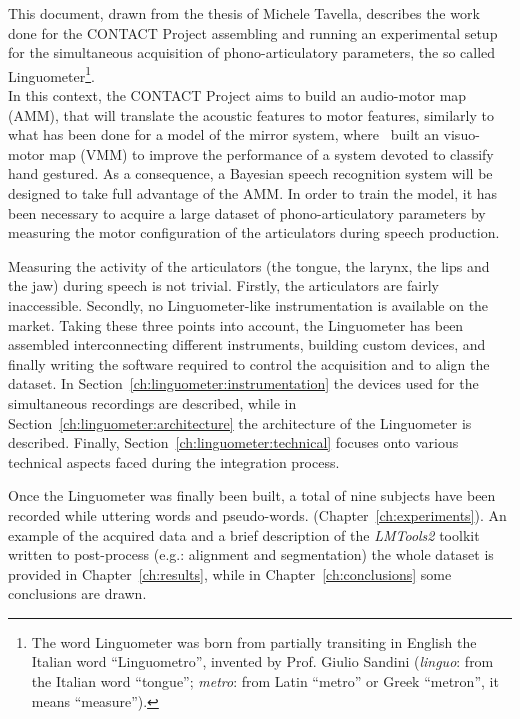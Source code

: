 This document, drawn from the thesis of Michele Tavella, 
describes the work done for the 
CONTACT Project assembling and running an experimental setup for the 
simultaneous acquisition of phono-articulatory parameters, the so called 
Linguometer\footnote{The 
word Linguometer was born from partially transiting in English the Italian word
``Linguometro'', invented by Prof. Giulio Sandini
(\emph{linguo}: from the Italian word ``tongue''; \emph{metro}: from Latin 
``metro'' or Greek ``metron'', it means ``measure'').}.\\

In this context, the CONTACT Project aims to build an audio-motor map (AMM), 
that will translate the acoustic features to motor features, similarly to what
has been done for a model of the mirror system, where~\citet{metta.etal:2006}
built an visuo-motor map (VMM) to improve the performance of a system devoted to
classify hand gestured.
As a consequence, a Bayesian speech recognition system will be designed to 
take full advantage of the AMM.
In order to train the model, it has been necessary 
to acquire a large dataset of phono-articulatory parameters
by measuring the motor configuration of the articulators during speech 
production.

Measuring the activity of the articulators (the tongue, the larynx, the lips and
the jaw) during speech is not trivial. 
Firstly, the articulators are fairly inaccessible.
Secondly, no Linguometer-like instrumentation is available on the market.
Taking these three points into account, the Linguometer has been assembled 
interconnecting different instruments, building custom devices, and finally
writing the software required to control the acquisition and to align the
dataset.
In Section~\ref{ch:linguometer:instrumentation} the devices
used for the simultaneous recordings are described, while in 
Section~\ref{ch:linguometer:architecture} the architecture of
the Linguometer is described. Finally, Section~\ref{ch:linguometer:technical}
focuses onto various technical aspects faced during the integration
process.

Once the Linguometer was finally been built, a total of nine
subjects have been recorded while uttering words and pseudo-words.
(Chapter~\ref{ch:experiments}).
An example of the acquired data and a brief description of the \emph{LMTools2}
toolkit written to post-process (e.g.: alignment and segmentation)
the whole dataset is provided in Chapter~\ref{ch:results}, while in
Chapter~\ref{ch:conclusions} some conclusions are drawn.

\pagebreak
